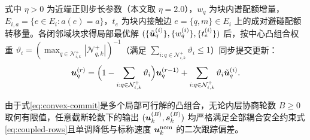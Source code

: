 \begin{enumerate}
\begin{equation}
 \end{equation}
 式中 $\eta>0$ 为近端正则步长参数（本文取 $\eta=2.0$），$w_q$ 为块内谱配额增量，$E_{i,a}=\{e\in E_i:a(e)=a\}$，$t_e$ 为块内接触边 $e=\{q,m\}\in E_i$ 上的成对避碰配额转移量。各闭邻域块求得局部最优解 $(\{\tilde{\boldsymbol{u}}_q^{(i)}\},\{w_q^{(i)}\},\{t_e^{(i)}\})$ 后，按中心凸组合权重 $\vartheta_i=(\max_{q\in\mathcal N_{i,k}^+}|\mathcal N_{q,k}^+|)^{-1}$（满足 $\sum_{i:q\in\mathcal N_{i,k}^+}\vartheta_i\le 1$）同步提交更新：
 \begin{equation}
  \boldsymbol{u}_q^{(r)}=\Big(1-\sum_{i:q\in\mathcal N_{i,k}^+}\vartheta_i\Big)\boldsymbol{u}_q^{(r-1)}+\sum_{i:q\in\mathcal N_{i,k}^+}\vartheta_i\tilde{\boldsymbol{u}}_q^{(i)}.
  \label{eq:convex-commit}
 \end{equation}
\end{enumerate}
由于式\eqref{eq:convex-commit}是多个局部可行解的凸组合，无论内层协商轮数 $B\ge 0$ 取何有限值，任意截断轮数下的输出 $(\boldsymbol{u}_k^{(B)},\boldsymbol s_k^{(B)})$ 均严格满足全部耦合安全约束式\eqref{eq:coupled-rows}且单调降低与标称速度 $\boldsymbol{u}_k^{\mathrm{nom}}$ 的二次跟踪偏差。
